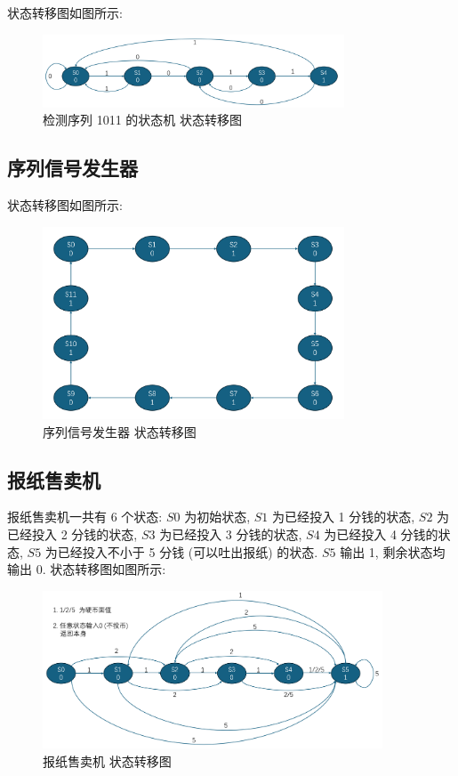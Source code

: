 \documentclass{article}
\begin{document}
状态转移图如图所示:

\begin{figure}[H]
    \centering
    \includegraphics[width=0.8\textwidth]{assets/graph_fsm_2.png}
    \caption{检测序列 1011 的状态机 状态转移图}
\end{figure}

\subsection{序列信号发生器}

状态转移图如图所示:

\begin{figure}[H]
    \centering
    \includegraphics[width=0.8\textwidth]{assets/graph_ssg.png}
    \caption{序列信号发生器 状态转移图}
\end{figure}

\subsection{报纸售卖机}

报纸售卖机一共有 6 个状态: \(S0\) 为初始状态, \(S1\) 为已经投入 1 分钱的状态, \(S2\) 为已经投入 2 分钱的状态, \(S3\) 为已经投入 3 分钱的状态, \(S4\) 为已经投入 4 分钱的状态, \(S5\) 为已经投入不小于 5 分钱 (可以吐出报纸) 的状态. \(S5\) 输出 1, 剩余状态均输出 0. 状态转移图如图所示:

\begin{figure}[H]
    \centering
    \includegraphics[width=0.9\textwidth]{assets/graph_ns.png}
    \caption{报纸售卖机 状态转移图}
\end{figure}
\end{document}
